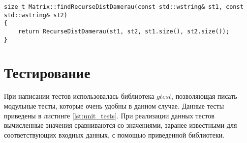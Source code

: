 \begin{lstlisting}[label=lst:damer_rec_meth, caption=Метод нахождения расстояния Дамерау-Левенштейна с использованием функции \ref{lst:damer_rec}]
size_t Matrix::findRecurseDistDamerau(const std::wstring& st1, const std::wstring& st2)
{
	return RecurseDistDamerau(st1, st2, st1.size(), st2.size());
}
\end{lstlisting}

\section{Тестирование}
При написании тестов использовалась библиотека $gtest$, позволяющая писать модульные тесты, которые очень удобны 
в данном случае. Данные тесты приведены в листинге  \ref{lst:unit_tests}. При реализации данных тестов вычисленные значения
сравниваются со значениями, заранее известными для соответствующих входных данных, с помощью приведенной библиотеки.
